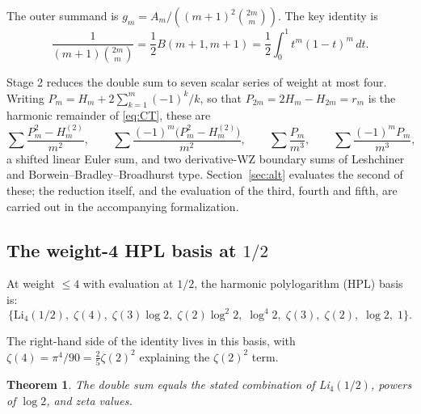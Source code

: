 \documentclass[11pt]{article}
\newtheorem{theorem}{Theorem}
\begin{document}
The outer summand is
$g_m = A_m / ((m+1)^2 \binom{2m}{m})$.
The key identity is
\[
\frac{1}{(m+1)\binom{2m}{m}}
= \frac{1}{2} B(m+1, m+1)
= \frac{1}{2} \int_0^1 t^m (1-t)^m\,dt.
\]

Stage 2 reduces the double sum to seven scalar series of weight at
most four.  Writing $P_m = H_m + 2\sum_{k=1}^{m}(-1)^k/k$, so that
$P_{2m} = 2H_m - H_{2m} = r_m$ is the harmonic remainder of
\eqref{eq:CT}, these are
\[
\sum \frac{P_{m}^{2} - H_{m}^{(2)}}{m^{2}},\qquad
\sum \frac{(-1)^{m}\bigl(P_{m}^{2} - H_{m}^{(2)}\bigr)}{m^{2}},\qquad
\sum \frac{P_m}{m^{3}},\qquad
\sum \frac{(-1)^{m}P_m}{m^{3}},
\]
a shifted linear Euler sum, and two derivative-WZ boundary sums of
Leshchiner and Borwein--Bradley--Broadhurst type.  Section~\ref{sec:alt}
evaluates the second of these; the reduction itself, and the evaluation
of the third, fourth and fifth, are carried out in the accompanying
formalization.

\subsection{The weight-4 HPL basis at $1/2$}

At weight $\le 4$ with evaluation at $1/2$, the harmonic
polylogarithm (HPL) basis is:
\[
\{\text{Li}_4(1/2),\; \zeta(4),\; \zeta(3)\log 2,\;
\zeta(2)\log^2 2,\; \log^4 2,\;
\zeta(3),\; \zeta(2),\; \log 2,\; 1\}.
\]

The right-hand side of the identity lives in this basis, with
$\zeta(4) = \pi^4/90 = \tfrac{2}{5}\zeta(2)^2$ explaining the
$\zeta(2)^2$ term.

\begin{theorem}
The double sum equals the stated combination of Li$_4(1/2)$,
powers of $\log 2$, and zeta values.
\end{theorem}
\end{document}
